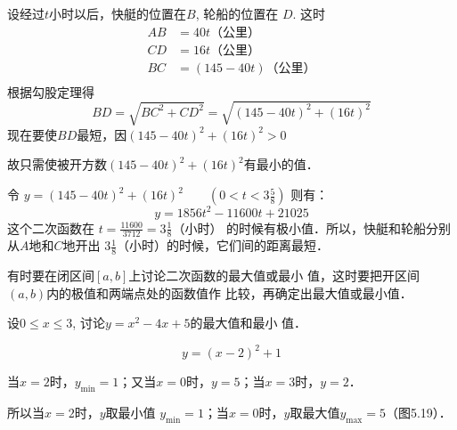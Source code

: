 \begin{solution}
    设经过$t$小时以后，快艇的位置在$B$, 轮船的位置在
$D$. 这时
\[\begin{split}
  AB&=40t \text{（公里）}\\
CD&=16t \text{（公里）}\\
BC&=(145-40t) \text{（公里）}\\  
\end{split}\]
根据勾股定理得
\[BD=\sqrt{BC^2+CD^2}=\sqrt{(145-40t)^2+(16t)^2}\]
现在要使$BD$最短，因$(145-40t)^2+(16t)^2>0$

故只需使被开方数$(145-40t)^2+(16t)^2$有最小的值．

令 $y=(145-40t)^2+(16t)^2\qquad \left(0<t<3\frac{5}{8}\right)$
则有：$$y=1856t^2-11600t+21025$$
这个二次函数在
$t=\frac{11600}{3712}=3\frac{1}{8}$（小时）
的时候有极小值．所以，快艇和轮船分别从$A$地和$C$地开出
$3\frac{1}{8}$（小时）的时候，它们间的距离最短．
\end{solution}

有时要在闭区间$[a,b]$上讨论二次函数的最大值或最小
值，这时要把开区间$(a,b)$内的极值和两端点处的函数值作
比较，再确定出最大值或最小值．


\begin{example}    
设$0\le x\le 3$, 讨论$y=x^2-4x+5$的最大值和最小
值．
\end{example}

\begin{solution}    
$$y=(x-2)^2+1$$

当$x=2$时，$y_{\min}=1$；又当$x=0$时，$y=5$；当$x=3$时，$y=2$．

所以当$x=2$时，$y$取最小值
$y_{\min}=1$；当$x=0$时，$y$取最大值$y_{\max}=5$（图5.19）．

\begin{figure}[htp]
    \centering
{}
    \caption{}
\end{figure}
\end{solution}    


